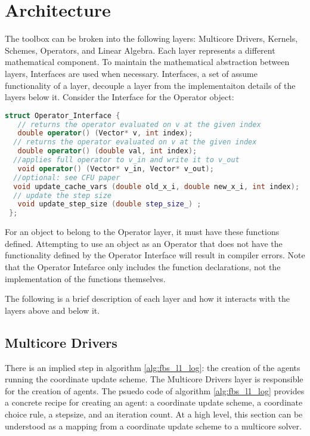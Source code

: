 \section{Architecture}

The toolbox can be broken into the following layers: Multicore Drivers, Kernels, Schemes, Operators, and Linear Algebra.
Each layer represents a different mathematical component. To maintain the mathematical abstraction between layers, Interfaces are used when necessary. 
Interfaces, a set of assume functionality of a layer, decouple a layer from the implementaiton details of the layers below it.
Consider the Interface for the Operator object:

\begin{lstlisting}[language=C++,label={Operator_Interface}]
struct Operator_Interface {
   // returns the operator evaluated on v at the given index
   double operator() (Vector* v, int index);
  // returns the operator evaluated on v at the given index
   double operator() (double val, int index);
  //applies full operator to v_in and write it to v_out
   void operator() (Vector* v_in, Vector* v_out);
  //optional: see CFU paper
  void update_cache_vars (double old_x_i, double new_x_i, int index);
  // update the step size
   void update_step_size (double step_size_) ;
 };
\end{lstlisting}

For an object to belong to the Operator layer, it must have these functions defined.
Attempting to use an object as an Operator that does not have the functionality defined by the Operator Interface will result in compiler errors.
Note that the Operator Intefarce only includes the function declarations, not the implementation of the functions themselves.

The following is a brief description of each layer and how it interacts with the layers above and below it.

\subsection{Multicore Drivers}

There is an implied step in algorithm \ref{alg:fbs_l1_log}: the creation of the agents running the coordinate update scheme.
The Multicore Drivers  layer is responsible for the creation of agents.
The psuedo code of algorithm \ref{alg:fbs_l1_log} provides a concrete recipe for creating an agent: a coordinate update scheme, a coordinate choice rule, a stepsize, and an iteration count.
At a high level, this section can be understood as a mapping from a coordinate update scheme to a multicore solver.

